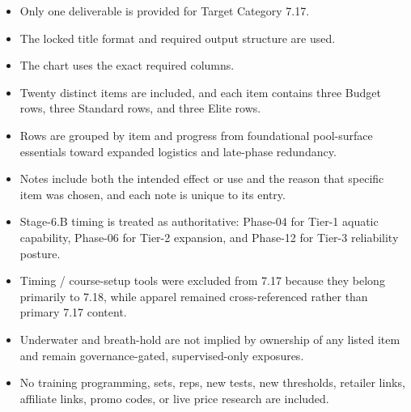 \documentclass[10pt]{article}
\begin{document}
\begin{landscape}
\begin{itemize}
\item Only one deliverable is provided for Target Category 7.17.
\item The locked title format and required output structure are used.
\item The chart uses the exact required columns.
\item Twenty distinct items are included, and each item contains three Budget rows, three Standard rows, and three Elite rows.
\item Rows are grouped by item and progress from foundational pool-surface essentials toward expanded logistics and late-phase redundancy.
\item Notes include both the intended effect or use and the reason that specific item was chosen, and each note is unique to its entry.
\item Stage-6.B timing is treated as authoritative: Phase-04 for Tier-1 aquatic capability, Phase-06 for Tier-2 expansion, and Phase-12 for Tier-3 reliability posture.
\item Timing / course-setup tools were excluded from 7.17 because they belong primarily to 7.18, while apparel remained cross-referenced rather than primary 7.17 content.
\item Underwater and breath-hold are not implied by ownership of any listed item and remain governance-gated, supervised-only exposures.
\item No training programming, sets, reps, new tests, new thresholds, retailer links, affiliate links, promo codes, or live price research are included.
\end{itemize}

\end{landscape}
\clearpage
\end{document}
